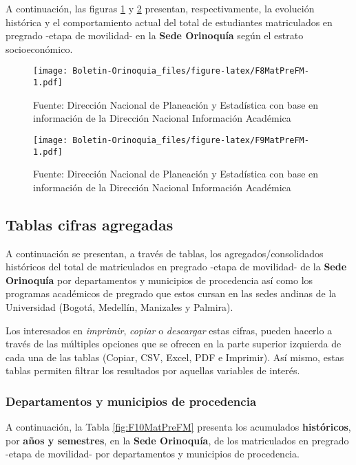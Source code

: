 \documentclass[
]{book}
\begin{document}
A continuación, las figuras \ref{fig:F8MatPreFM} y \ref{fig:F9MatPreFM} presentan, respectivamente, la evolución histórica y el comportamiento actual del total de estudiantes matriculados en pregrado -etapa de movilidad- en la \textbf{Sede Orinoquía} según el estrato socioeconómico.

\begin{figure}
\centering
\texttt{[image: Boletin-Orinoquia\_files/figure-latex/F8MatPreFM-1.pdf]}
\caption{\label{fig:F8MatPreFM}Fuente: Dirección Nacional de Planeación y Estadística con base en información de la Dirección Nacional Información Académica}
\end{figure}

\begin{figure}
\centering
\texttt{[image: Boletin-Orinoquia\_files/figure-latex/F9MatPreFM-1.pdf]}
\caption{\label{fig:F9MatPreFM}Fuente: Dirección Nacional de Planeación y Estadística con base en información de la Dirección Nacional Información Académica}
\end{figure}

\hypertarget{tablas-cifras-agregadas-4}{%
\subsection{Tablas cifras agregadas}\label{tablas-cifras-agregadas-4}}

A continuación se presentan, a través de tablas, los agregados/consolidados históricos del total de matriculados en pregrado -etapa de movilidad- de la \textbf{Sede Orinoquía} por departamentos y municipios de procedencia así como los programas académicos de pregrado que estos cursan en las sedes andinas de la Universidad (Bogotá, Medellín, Manizales y Palmira).

Los interesados en \emph{imprimir}, \emph{copiar} o \emph{descargar} estas cifras, pueden hacerlo a través de las múltiples opciones que se ofrecen en la parte superior izquierda de cada una de las tablas (Copiar, CSV, Excel, PDF e Imprimir). Así mismo, estas tablas permiten filtrar los resultados por aquellas variables de interés.

\hypertarget{departamentos-y-municipios-de-procedencia-3}{%
\subsubsection{Departamentos y municipios de procedencia}\label{departamentos-y-municipios-de-procedencia-3}}

A continuación, la Tabla \ref{fig:F10MatPreFM} presenta los acumulados \textbf{históricos}, por \textbf{años y semestres}, en la \textbf{Sede Orinoquía}, de los matriculados en pregrado -etapa de movilidad- por departamentos y municipios de procedencia.
\end{document}
